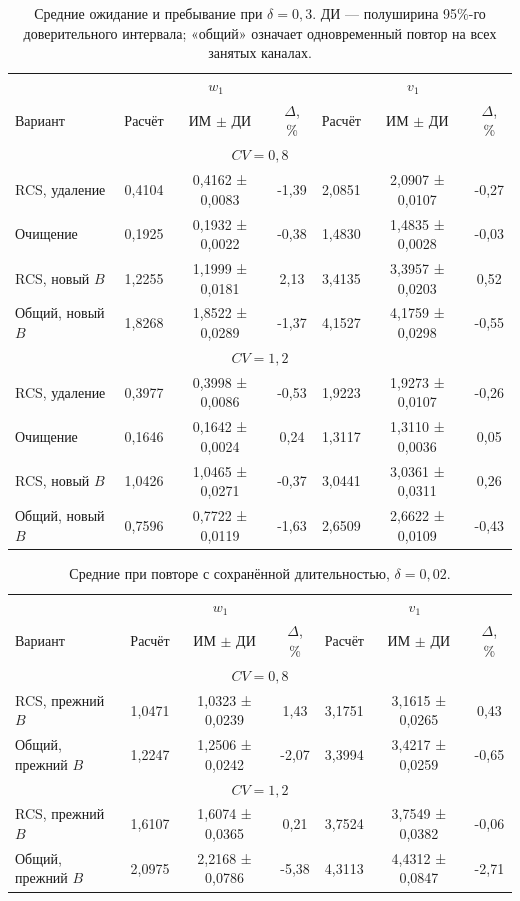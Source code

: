 \begin{table}[!htbp]
\centering\small\setlength{\tabcolsep}{3pt}
\begin{tabular}{@{}lcccccc@{}}
\toprule
 & \multicolumn{3}{c}{$w_1$} & \multicolumn{3}{c}{$v_1$} \\
Вариант & Расчёт & ИМ $\pm$ ДИ & $\Delta$, \% & Расчёт & ИМ $\pm$ ДИ & $\Delta$, \% \\
\midrule
\multicolumn{7}{c}{$CV=0,8$} \\
RCS, удаление & 0,4104 & 0,4162 ± 0,0083 & -1,39 & 2,0851 & 2,0907 ± 0,0107 & -0,27 \\
Очищение & 0,1925 & 0,1932 ± 0,0022 & -0,38 & 1,4830 & 1,4835 ± 0,0028 & -0,03 \\
RCS, новый $B$ & 1,2255 & 1,1999 ± 0,0181 & 2,13 & 3,4135 & 3,3957 ± 0,0203 & 0,52 \\
Общий, новый $B$ & 1,8268 & 1,8522 ± 0,0289 & -1,37 & 4,1527 & 4,1759 ± 0,0298 & -0,55 \\
\multicolumn{7}{c}{$CV=1,2$} \\
RCS, удаление & 0,3977 & 0,3998 ± 0,0086 & -0,53 & 1,9223 & 1,9273 ± 0,0107 & -0,26 \\
Очищение & 0,1646 & 0,1642 ± 0,0024 & 0,24 & 1,3117 & 1,3110 ± 0,0036 & 0,05 \\
RCS, новый $B$ & 1,0426 & 1,0465 ± 0,0271 & -0,37 & 3,0441 & 3,0361 ± 0,0311 & 0,26 \\
Общий, новый $B$ & 0,7596 & 0,7722 ± 0,0119 & -1,63 & 2,6509 & 2,6622 ± 0,0109 & -0,43 \\
\bottomrule
\end{tabular}
\caption{Средние ожидание и пребывание при $\delta=0{,}3$. ДИ --- полуширина 95\%-го доверительного интервала; «общий» означает одновременный повтор на всех занятых каналах.}
\label{tab:results}
\end{table}

\begin{table}[!htbp]
\centering\small\setlength{\tabcolsep}{3pt}
\begin{tabular}{@{}lcccccc@{}}
\toprule
 & \multicolumn{3}{c}{$w_1$} & \multicolumn{3}{c}{$v_1$} \\
Вариант & Расчёт & ИМ $\pm$ ДИ & $\Delta$, \% & Расчёт & ИМ $\pm$ ДИ & $\Delta$, \% \\
\midrule
\multicolumn{7}{c}{$CV=0,8$} \\
RCS, прежний $B$ & 1,0471 & 1,0323 ± 0,0239 & 1,43 & 3,1751 & 3,1615 ± 0,0265 & 0,43 \\
Общий, прежний $B$ & 1,2247 & 1,2506 ± 0,0242 & -2,07 & 3,3994 & 3,4217 ± 0,0259 & -0,65 \\
\multicolumn{7}{c}{$CV=1,2$} \\
RCS, прежний $B$ & 1,6107 & 1,6074 ± 0,0365 & 0,21 & 3,7524 & 3,7549 ± 0,0382 & -0,06 \\
Общий, прежний $B$ & 2,0975 & 2,2168 ± 0,0786 & -5,38 & 4,3113 & 4,4312 ± 0,0847 & -2,71 \\
\bottomrule
\end{tabular}
\caption{Средние при повторе с сохранённой длительностью, $\delta=0{,}02$.}
\label{tab:results_fixed}
\end{table}

